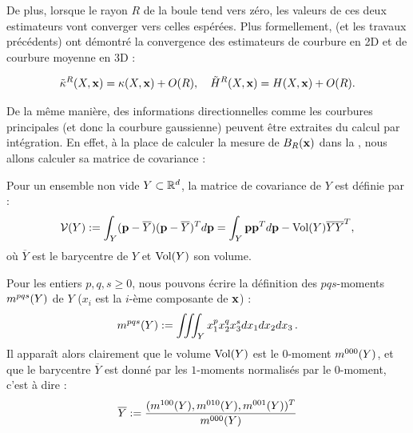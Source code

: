%
De plus, lorsque le rayon $R$ de la boule tend vers zéro, les valeurs de ces
deux estimateurs vont converger vers celles espérées. Plus formellement,
 (et les travaux précédents) ont démontré la
convergence des estimateurs de courbure en 2D et de courbure moyenne en 3D :
%
\begin{theorem}{}
  \label{theo:pottmann-2d-3d-mean-conv}
  \begin{equation}
    \tilde{\kappa}^{R}(X,\mathbf{x}) = \kappa(X,\mathbf{x}) + O(R),
    \quad\tilde{H}^{R}(X,\mathbf{x}) = H(X,\mathbf{x}) + O(R).
  \end{equation}
\end{theorem}
%
De la même manière, des informations directionnelles comme les courbures
principales (et donc la courbure gaussienne) peuvent être extraites du calcul
par intégration. En effet, à la place de calculer la mesure de $B_{R}(\mathbf{x})$
dans la , nous allons calculer sa matrice
de covariance :
%
\begin{definition}
  \label{def:cov-matrix}
  Pour un ensemble non vide $Y \subset \mathbb{R}^d$, la matrice de covariance de $Y$
  est définie par :
  \begin{equation}
    \mathcal{V}(Y) := \int_Y (\mathbf{p}-\overline{Y})(\mathbf{p}-\overline{Y})^T d\mathbf{p} = \int_Y \mathbf{p} \mathbf{p}^T d\mathbf{p} - \mathrm{Vol}(Y)\overline{Y}\overline{Y}^T,
  \end{equation}
  où $\overline{Y}$ est le barycentre de $Y$ et $\mathrm{Vol}(Y)$ son volume.
\end{definition}
%
Pour les entiers $p, q, s \ge 0$, nous pouvons écrire la définition des $
pqs$-moments $m^{pqs}(Y)$ de $Y$ ($x_i$ est la $i$-ème composante de $\mathbf{x}$) :
%
\begin{equation}
  \label{eq:moments}
  m^{pqs}(Y) := \iiint_Y x_1^p x_2^q x_3^s dx_1 dx_2 dx_3\,.
\end{equation}
%
Il apparaît alors clairement que le volume $\mathrm{Vol}(Y)$ est le $0$-moment
$m^{000}(Y)$, et que le barycentre $\overline{Y}$ est donné par les $1$-moments
normalisés par le $0$-moment, c'est à dire :
%
\begin{equation}
  \overline{Y} := \frac{( m^{100}(Y), m^{010}(Y), m^{001}(Y) )^T}{m^{000}(Y)}
\end{equation}
%
